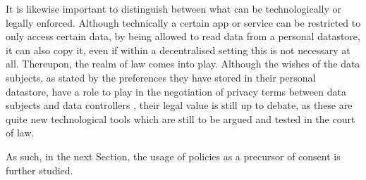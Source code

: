 
It is likewise important to distinguish between what can be technologically or legally enforced.
Although technically a certain app or service can be restricted to only access certain data, by being allowed to read data from a personal datastore, it can also copy it, even if within a decentralised setting this is not necessary at all.
Thereupon, the realm of law comes into play.
Although the wishes of the data subjects, as stated by the preferences they have stored in their personal datastore, have a role to play in the negotiation of privacy terms between data subjects and data controllers \citep{verborgh_paradigm_2017}, their legal value is still up to debate, as these are quite new technological tools which are still to be argued and tested in the court of law.

As such, in the next Section, the usage of policies as a precursor of consent is further studied.